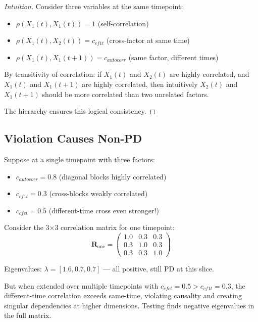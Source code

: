 \documentclass[12pt,a4paper]{article}
\theoremstyle{definition}
\begin{document}
\begin{proof}[Intuition]
Consider three variables at the same timepoint:
\begin{itemize}
  \item $\rho(X_1(t), X_1(t)) = 1$ (self-correlation)
  \item $\rho(X_1(t), X_2(t)) = c_{cf1t}$ (cross-factor at same time)
  \item $\rho(X_1(t), X_1(t+1)) = c_{autocorr}$ (same factor, different times)
\end{itemize}

By transitivity of correlation: if $X_1(t)$ and $X_2(t)$ are highly correlated, and $X_1(t)$ and $X_1(t+1)$ are highly correlated, then intuitively $X_2(t)$ and $X_1(t+1)$ should be more correlated than two unrelated factors.

The hierarchy ensures this logical consistency.
\end{proof}

\subsection{Violation Causes Non-PD}

\begin{example}
Suppose at a single timepoint with three factors:
\begin{itemize}
  \item $c_{autocorr} = 0.8$ (diagonal blocks highly correlated)
  \item $c_{cf1t} = 0.3$ (cross-blocks weakly correlated)
  \item $c_{cfct} = 0.5$ (different-time cross even stronger!)
\end{itemize}

Consider the 3×3 correlation matrix for one timepoint:
\[
  \mathbf{R}_{\text{one}} = \begin{pmatrix}
    1.0 & 0.3 & 0.3 \\
    0.3 & 1.0 & 0.3 \\
    0.3 & 0.3 & 1.0
  \end{pmatrix}
\]

Eigenvalues: $\lambda = [1.6, 0.7, 0.7]$ — all positive, still PD at this slice.

But when extended over multiple timepoints with $c_{cfct} = 0.5 > c_{cf1t} = 0.3$, the different-time correlation exceeds same-time, violating causality and creating singular dependencies at higher dimensions. Testing finds negative eigenvalues in the full matrix.
\end{example}
\end{document}
